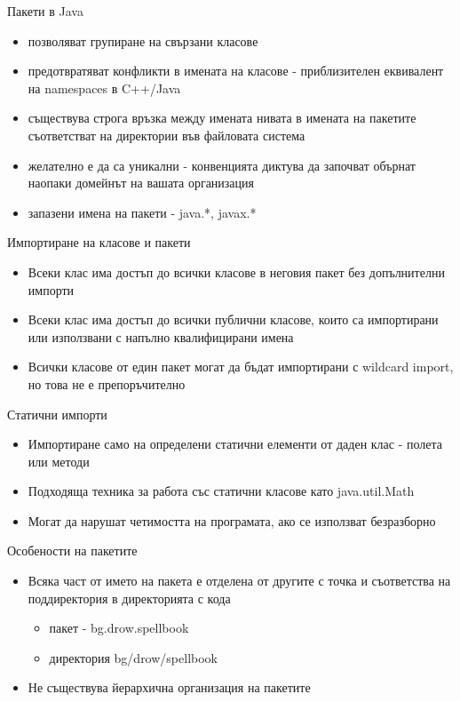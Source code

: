 \documentclass{beamer}
\begin{document}
\begin{frame}{Пакети в Java}
  \transdissolve
  \begin{itemize}
  \item позволяват групиране на свързани класове
  \item предотвратяват конфликти в имената на класове - приблизителен
    еквивалент на namespaces в C++/Java
  \item съществува строга връзка между имената нивата в имената на
    пакетите съответстват на директории във файловата система
  \item желателно е да са уникални - конвенцията диктува да започват
    обърнат наопаки домейнът на вашата организация
  \item запазени имена на пакети - java.*, javax.*
  \end{itemize}
\end{frame}

\begin{frame}{Импортиране на класове и пакети}
  \transdissolve
  \begin{itemize}
  \item Всеки клас има достъп до всички класове в неговия пакет без
    допълнителни импорти
  \item Всеки клас има достъп до всички публични класове, които са
    импортирани или използвани с напълно квалифицирани имена
  \item Всички класове от един пакет могат да бъдат импортирани с
    wildcard import, но това не е препоръчително
  \end{itemize}
\end{frame}

\begin{frame}{Статични импорти}
  \transdissolve
  \begin{itemize}
  \item Импортиране само на определени статични елементи от даден клас
    - полета или методи
  \item Подходяща техника за работа със статични класове като
    java.util.Math
  \item Могат да нарушат четимостта на програмата, ако се използват безразборно
  \end{itemize}
\end{frame}

\begin{frame}{Особености на пакетите}
  \transdissolve
  \begin{itemize}
  \item Всяка част от името на пакета е отделена от другите с точка и
    съответства на поддиректория в директорията с кода
    \begin{itemize}
    \item пакет - bg.drow.spellbook
    \item директория bg/drow/spellbook
    \end{itemize}
  \item Не съществува йерархична организация на пакетите
  \end{itemize}
\end{frame}
\end{document}
